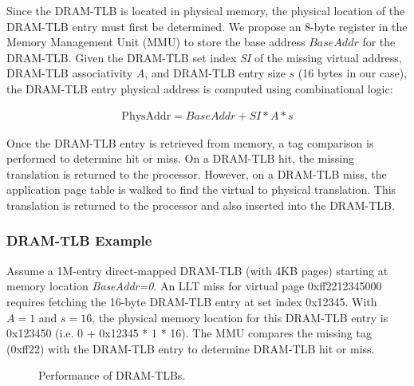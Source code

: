 
\noindent Since the DRAM-TLB is located in physical memory, the
physical location of the DRAM-TLB entry must first be determined. We
propose an 8-byte register in the Memory Management Unit (MMU) to
store the base address $BaseAddr$ for the DRAM-TLB. Given the DRAM-TLB
set index {\em SI} of the missing virtual address, DRAM-TLB
associativity $A$, and DRAM-TLB entry size $s$ (16 bytes in our case),
the DRAM-TLB entry physical address is computed using combinational
logic:

\begin{equation}
  \begin{array}{rl}
    \text{PhysAddr} = BaseAddr + SI * A * s
  \end{array}
\end{equation}

\noindent Once the DRAM-TLB entry is retrieved from memory, a tag
comparison is performed to determine hit or miss. On a DRAM-TLB hit,
the missing translation is returned to the processor. However, on a
DRAM-TLB miss, the application page table is walked to find the
virtual to physical translation. This translation is returned to the
processor and also inserted into the DRAM-TLB.

\subsubsection{DRAM-TLB Example}

\noindent Assume a 1M-entry direct-mapped DRAM-TLB (with 4KB pages)
starting at memory location {\em BaseAddr=0}. An LLT miss for virtual
page 0xff2212345000 requires fetching the 16-byte DRAM-TLB entry at
set index 0x12345. With $A=1$ and $s=16$, the physical memory location
for this DRAM-TLB entry is 0x123450 (i.e. 0 + 0x12345 * 1 * 16). The
MMU compares the missing tag (0xff22) with the DRAM-TLB entry to
determine DRAM-TLB hit or miss.


\begin{figure}[tp] 
  \vspace{-0.in} \centering
  \centerline{}

  \caption{\small Performance of DRAM-TLBs. \normalsize}
  \label{fig:perf_DRAMTLB} 
  \vspace{0.2 in}
\end{figure}

